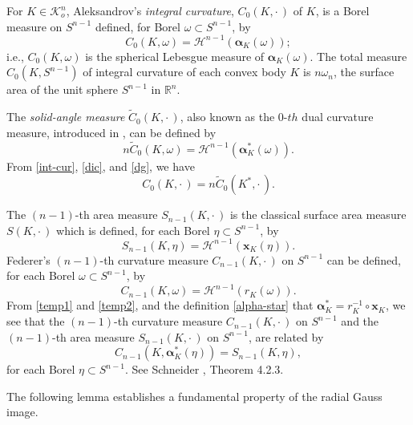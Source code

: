 \documentclass{cpamart1}     %
\theoremstyle{definition}
\theoremstyle{remark}
\newcommand{\rn}{\mathbb R^n}
\newcommand{\sn}{S^{n-1}}
\newcommand{\kno}{\mathcal K^n_o}
\newcommand{\bx}{\pmb{x}}
\newcommand{\balpha}{\pmb{\alpha}}
\newcommand{\wt}{\widetilde}
\begin{document}
\smallskip


For $K\in\kno$, Aleksandrov's
{\it integral curvature}, $C_0(K, \cdot\,)$ of $K$, is a Borel measure on $\sn$ defined,
for Borel $\omega \subset \sn$,  by
\begin{equation}\label{int-cur}
C_0(K, \omega) = \mathcal H^{n-1}(\balpha_K(\omega));
\end{equation}
i.e., $C_0(K,\omega)$ is the spherical Lebesgue measure of $\balpha_K(\omega)$.
The total measure $C_0(K, \sn)$ of integral curvature of each convex body $K$ is $n\omega_n$,
the surface area of the unit sphere $\sn$ in $\rn$.

The {\it solid-angle measure} $\wt C_0(K, \cdot\,)$, also known as the 0-$th$ dual curvature measure,
introduced in  \cite{HLYZ16}, can be defined by
\begin{equation}\label{dic}
n\wt C_0(K, \omega) = \mathcal H^{n-1}(\balpha_K^*(\omega)).
\end{equation}
From \eqref{int-cur}, \eqref{dic}, and \eqref{dg}, we have
\begin{equation*}
C_0(K,\cdot\,)=n \wt C_0(K^*,\cdot\,).
\end{equation*}


The $(n-1)$-th area measure $S_{n-1}(K,\cdot\,)$
is the classical surface area measure $S(K,\cdot\,)$
which is defined, for each Borel $\eta\subset\sn$, by
\begin{equation}\label{temp1}
S_{n-1}(K, \eta) = \mathcal H^{n-1}(\bx_K(\eta)).
\end{equation}
Federer's $(n - 1)$-th curvature measure $C_{n-1}(K, \cdot\,)$ on $\sn$ can be defined,
for each Borel $\omega\subset\sn$, by
\begin{equation}\label{temp2}
C_{n-1}(K, \omega) = \mathcal H^{n-1}(r_K(\omega)).
\end{equation}
From \eqref{temp1} and \eqref{temp2}, and the definition \eqref{alpha-star} that
$\balpha^*_K = r_K^{-1}\circ \bx_K$, we see that the $(n - 1)$-th
curvature measure $C_{n-1}(K, \cdot\,)$ on $\sn$ and the $(n-1)$-th area measure
$S_{n-1}(K,\cdot\,)$ on $\sn$, are related by
\begin{equation}\label{temp3}
C_{n-1}(K,\balpha^*_K(\eta)) = S_{n-1}(K, \eta),
\end{equation}
for each Borel $\eta\subset\sn$.
See Schneider \cite{S14}, Theorem 4.2.3.



The following lemma establishes a fundamental property of the radial Gauss image.
\end{document}
